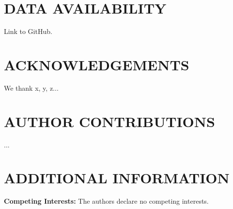 \documentclass[prd,twocolumn,tightenlines,preprintnumbers,showpacs,superscriptaddress,notitlepage,nofootinbib,eqsecnum,
floatfix,longbibliography,aps,10pt]{revtex4-2}
\begin{document}
\section{DATA AVAILABILITY}

Link to GitHub.

\section{ACKNOWLEDGEMENTS}

We thank x, y, z...

\section{AUTHOR CONTRIBUTIONS}

...

\section{ADDITIONAL INFORMATION}

\textbf{Competing Interests:} The authors declare no competing interests.



\end{document}

